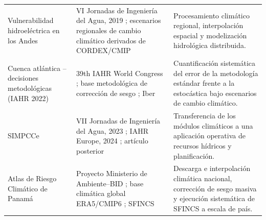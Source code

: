 \begin{longtable}{p{}p{}p{}}
  Vulnerabilidad hidroeléctrica en los Andes & VI Jornadas de Ingeniería del Agua, 2019 \parencite{deljesus2019andean}; escenarios regionales de cambio climático derivados de CORDEX/CMIP & Procesamiento climático regional, interpolación espacial y modelización hidrológica distribuida. \\
  Cuenca atlántica -- decisiones metodológicas (IAHR 2022) & 39th IAHR World Congress \parencite{deljesus2022iahr}; base metodológica de corrección de sesgo \parencite{teutschbein2012biascorrection}; Iber \parencite{blade2014iber} & Cuantificación sistemática del error de la metodología estándar frente a la estocástica bajo escenarios de cambio climático. \\
  SIMPCCe & VII Jornadas de Ingeniería del Agua, 2023 \parencite{navas2023simpce}; IAHR Europe, 2024 \parencite{navas2024iahrsimpcce}; artículo posterior \parencite{navas2025simpce} & Transferencia de los módulos climáticos a una aplicación operativa de recursos hídricos y planificación. \\
  Atlas de Riesgo Climático de Panamá & Proyecto Ministerio de Ambiente--BID \parencite{ihcantabria2023panama}; base climática global ERA5/CMIP6 \parencite{hersbach2020era5,eyring2016cmip6}; SFINCS \parencite{leijnse2021sfincs} & Descarga e interpolación climática nacional, corrección de sesgo masiva y ejecución sistemática de SFINCS a escala de país. \\
  \bottomrule
\end{longtable}

